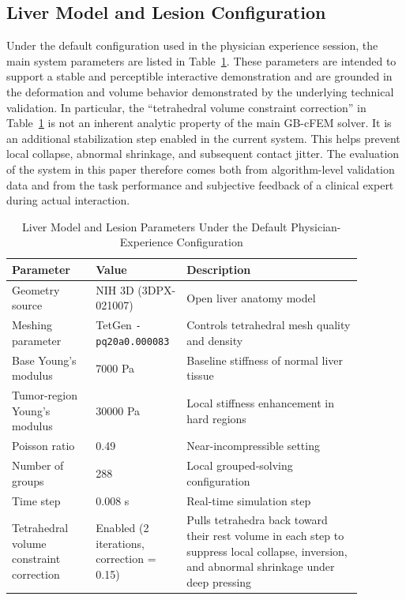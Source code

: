 \documentclass{ieeeaccess}
\begin{document}
\subsection{Liver Model and Lesion Configuration}
Under the default configuration used in the physician experience session, the main system parameters are listed in Table~\ref{tab:model}. These parameters are intended to support a stable and perceptible interactive demonstration and are grounded in the deformation and volume behavior demonstrated by the underlying technical validation. In particular, the ``tetrahedral volume constraint correction'' in Table~\ref{tab:model} is not an inherent analytic property of the main GB-cFEM solver. It is an additional stabilization step enabled in the current system. This helps prevent local collapse, abnormal shrinkage, and subsequent contact jitter. The evaluation of the system in this paper therefore comes both from algorithm-level validation data and from the task performance and subjective feedback of a clinical expert during actual interaction.

\begin{table}[htbp]
\caption{Liver Model and Lesion Parameters Under the Default Physician-Experience Configuration}
\label{tab:model}
\centering
\footnotesize
\renewcommand{\arraystretch}{1.15}
\begin{tabular}{|p{0.22\linewidth}|p{0.20\linewidth}|p{0.46\linewidth}|}
\hline
Parameter & Value & Description \\
\hline
Geometry source & NIH 3D (3DPX-021007) & Open liver anatomy model \\
\hline
Meshing parameter & TetGen \texttt{-pq20a0.00}\allowbreak\texttt{0083} & Controls tetrahedral mesh quality and density \\
\hline
Base Young's modulus & 7000 Pa & Baseline stiffness of normal liver tissue \\
\hline
Tumor-region Young's modulus & 30000 Pa & Local stiffness enhancement in hard regions \\
\hline
Poisson ratio & 0.49 & Near-incompressible setting \\
\hline
Number of groups & 288 & Local grouped-solving configuration \\
\hline
Time step & 0.008 s & Real-time simulation step \\
\hline
Tetrahedral volume constraint correction & Enabled (2 iterations, correction = 0.15) & Pulls tetrahedra back toward their rest volume in each step to suppress local collapse, inversion, and abnormal shrinkage under deep pressing \\
\hline
\end{tabular}
\end{table}
\end{document}
